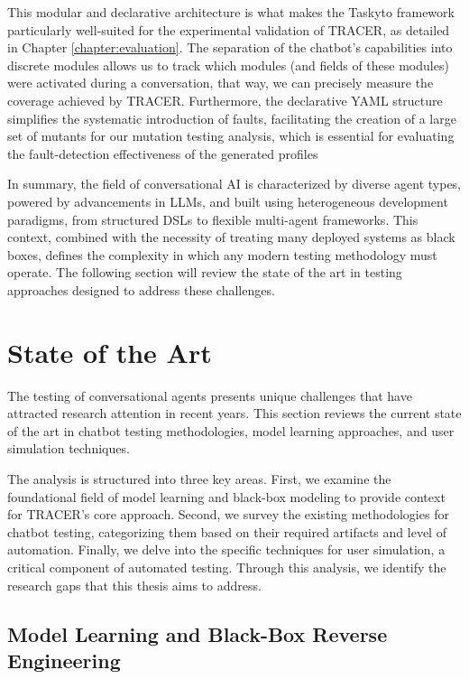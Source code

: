This modular and declarative architecture
is what makes the Taskyto framework particularly well-suited
for the experimental validation of TRACER,
as detailed in Chapter \ref{chapter:evaluation}.
The separation of the chatbot's capabilities into discrete modules
allows us to track which modules
(and fields of these modules)
were activated during a conversation,
that way, we can precisely measure the coverage
achieved by \ac{TRACER}.
Furthermore, the declarative YAML structure
simplifies the systematic introduction of faults,
facilitating the creation of a large set of mutants
for our mutation testing analysis,
which is essential for evaluating
the fault-detection effectiveness of the generated profiles

\indent

In summary,
the field of conversational \ac{AI} is characterized by diverse agent types,
powered by advancements in \acp{LLM},
and built using heterogeneous development paradigms,
from structured \acp{DSL} to flexible multi-agent frameworks.
This context, combined with the necessity of treating many deployed systems as black boxes,
defines the complexity in which any modern testing methodology must operate.
The following section will review the state of the art in testing approaches designed to address these challenges.

\section{State of the Art}\label{sec:sota}

The testing of conversational agents presents unique challenges
that have attracted research attention in recent years.
This section reviews the current state of the art in
chatbot testing methodologies, model learning approaches, and user simulation techniques.

The analysis is structured into three key areas.
First, we examine the foundational field of model learning
and black-box modeling to provide context for TRACER's core approach.
Second, we survey the existing methodologies for chatbot testing,
categorizing them based on their required artifacts and level of automation.
Finally, we delve into the specific techniques for user simulation,
a critical component of automated testing.
Through this analysis, we identify the research gaps that this thesis aims to address.

\subsection{Model Learning and Black-Box Reverse Engineering}

